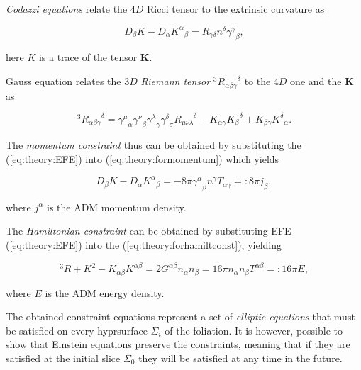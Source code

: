 \textit{Codazzi equations} relate the $4D$ Ricci tensor to the extrinsic curvature as

\begin{equation}
D_{\beta}K-D_{\alpha}{K^{\alpha}}_{\beta}=R_{\gamma\delta}n^{\delta}{\gamma^{\gamma}}_{\beta},
\label{eq:theory:formomentum}
\end{equation}

here $K$ is a trace of the tensor $\boldsymbol{K}$.

Gauss equation relates the $3D$ \textit{Riemann tensor} $^3{R_{\alpha\beta\gamma}}^{\delta}$ to the $4D$ one and the $\boldsymbol{K}$ as 

\begin{equation}
^3{R_{\alpha\beta\gamma}}^{\delta} = {\gamma^{\mu}}_{\alpha}{\gamma^{\nu}}_{\beta}{\gamma^{\lambda}}_{\gamma}{\gamma^{\delta}}_{\sigma}{R_{\mu\nu\lambda}}^{\delta}-K_{\alpha\gamma}{K_{\beta}}^{\delta}+K_{\beta\gamma}{K^{\delta}}_{\alpha}.
\label{eq:theory:forhamiltconst}
\end{equation}

The \textit{momentum constraint} thus can be obtained by substituting the (\ref{eq:theory:EFE}) into  (\ref{eq:theory:formomentum}) which yields

\begin{equation}
D_{\beta}K-D_{\alpha}{K^{\alpha}}_{\beta} = -8\pi{\gamma^{\alpha}}_{\beta} n^{\gamma}T_{\alpha\gamma}=:8\pi j_{\beta},
\label{eq:theory:momconstraint}
\end{equation}

where $j^{\alpha}$ is the ADM momentum density.

The \textit{Hamiltonian constraint} can be obtained by substituting EFE (\ref{eq:theory:EFE}) into the (\ref{eq:theory:forhamiltconst}), yielding 

\begin{equation}
^3 R+ K^2 - K_{\alpha\beta}K^{\alpha\beta} = 2G^{\alpha\beta}n_{\alpha}n_{\beta} = 16\pi n_{\alpha}n_{\beta} T^{\alpha\beta} =: 16\pi E,
\label{eq:theory:hamilconstraint}
\end{equation}

where $E$ is the ADM energy density.

The obtained constraint equations represent a set of \textit{elliptic equations} that must be satisfied on every hyprsurface $\Sigma_i$ of the foliation. 
It is however, possible to show that Einstein equations preserve the constraints, meaning that if they are satisfied at the initial slice $\Sigma_0$ they will be satisfied at any time in the future.


